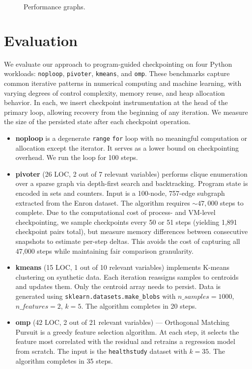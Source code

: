 \begin{figure*}[t]
    \centering
  \else
    
  \fi
  \caption{Performance graphs.}
\end{figure*}

\section{Evaluation}
\label{sec:evaluation}
We evaluate our approach to program-guided checkpointing on four Python workloads: \texttt{noploop}, \texttt{pivoter}, \texttt{kmeans}, and \texttt{omp}. These benchmarks capture common iterative patterns in numerical computing and machine learning, with varying degrees of control complexity, memory reuse, and heap allocation behavior. In each, we insert checkpoint instrumentation at the head of the primary loop, allowing recovery from the beginning of any iteration. We measure the size of the persisted state after each checkpoint operation.

\begin{itemize}
    \item \textbf{noploop} is a degenerate \texttt{range} \texttt{for} loop with no meaningful computation or allocation except the iterator. It serves as a lower bound on checkpointing overhead. We run the loop for 100 steps.

    \item \textbf{pivoter} (26 LOC, 2 out of 7 relevant variables) performs clique enumeration over a sparse graph via depth-first search and backtracking. Program state is encoded in sets and counters. Input is a 100-node, 757-edge subgraph extracted from the Enron dataset. The algorithm requires $\sim 47,000$ steps to complete. Due to the computational cost of process- and VM-level checkpointing, we sample checkpoints every 50 or 51 steps (yielding 1,891 checkpoint pairs total), but measure memory differences between consecutive snapshots to estimate per-step deltas. This avoids the cost of capturing all 47,000 steps while maintaining fair comparison granularity.

    \item \textbf{kmeans} (15 LOC, 1 out of 10 relevant variables) implements K-means clustering on synthetic data. Each iteration reassigns samples to centroids and updates them. Only the centroid array needs to persist. Data is generated using \texttt{sklearn.datasets.make\_blobs} with $n\_samples=1000$, $n\_features=2$, $k=5$. The algorithm completes in 20 steps.

    \item \textbf{omp} (42 LOC, 2 out of 21 relevant variables) --- Orthogonal Matching Pursuit is a greedy feature selection algorithm. At each step, it selects the feature most correlated with the residual and retrains a regression model from scratch. The input is the \texttt{healthstudy} dataset with $k = 35$. The algorithm completes in 35 steps.
\end{itemize}

